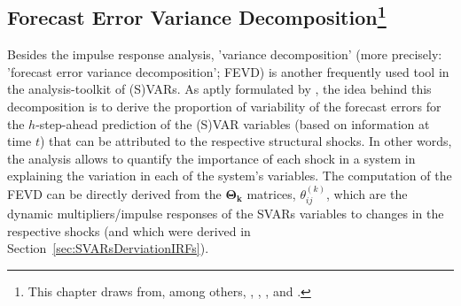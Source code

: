 \documentclass[a4paper,11pt,listof=nochaptergap,oneside,pointednumbers,bibtotoc,bigheadings,liststotoc,hidelinks]{scrbook}
\theoremstyle{mysatz}
\theoremstyle{mydefinition}
\theoremstyle{mytheorem}
\theoremstyle{mybemerkung}
\newcommand{\vect}[1]{\boldsymbol{\mathbf{#1}}}
\begin{document}
\subsection[Forecast Error Variance Decomposition]{Forecast Error Variance Decomposition\footnote{This chapter draws from, among others, \citet{lutkepohl:10}, \citet{lutkepohl:05}, \citet{lutkepohlkilian:17}, \citet{zivot:00} and \citet{sims:11}.}}
\label{sec:FEVDTheory}
Besides the impulse response analysis, 'variance decomposition' (more precisely: 'forecast error variance decomposition'; FEVD) is another frequently used tool in the analysis-toolkit of (S)VARs. As aptly formulated by \citet{zivot:00}, the idea behind this decomposition is to derive the proportion of variability of the forecast errors for the $h$-step-ahead prediction of the (S)VAR variables (based on information at time $t$) that can be attributed to the respective structural shocks. In other words, the analysis allows to quantify the importance of each shock in a system in explaining the variation in each of the system's variables.  The computation of the FEVD can be directly derived from the $\vect{\Theta_k}$ matrices, $\theta_{ij}^{(k)}$, which are the dynamic multipliers/impulse responses of the SVARs variables to changes in the respective shocks (and which were derived in Section~\ref{sec:SVARsDerviationIRFs}).
\end{document}

